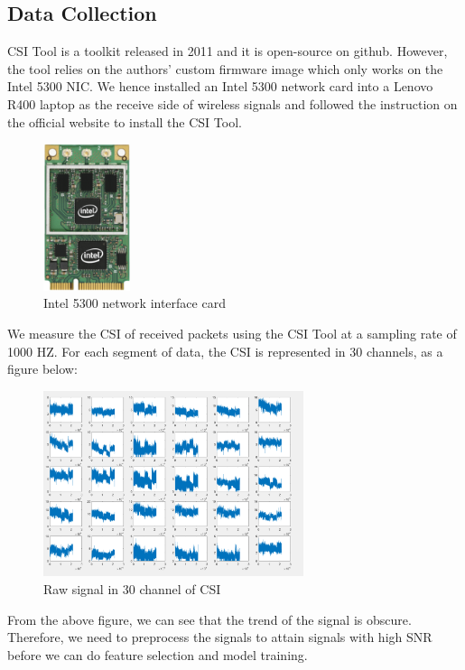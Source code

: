 \documentclass[conference]{IEEEtran}
\begin{document}
\subsection{Data Collection}

CSI Tool \cite{halperin2011tool} is a toolkit released in 2011 and it is open-source on github. However, the tool relies on the authors' custom firmware image which only works on the Intel 5300 NIC.
We hence installed an Intel 5300 network card into a Lenovo R400 laptop as the receive side of wireless signals and followed the instruction on the official website to install the CSI Tool.
\begin{figure}[H]
\begin{center}
\includegraphics[width=1in]{NIC.png}
\caption{Intel 5300 network interface card}
\end{center}
\end{figure}
We measure the CSI of received packets using the CSI Tool at a sampling rate of 1000 HZ. For each segment of data, the CSI is represented in 30 channels, as a figure below:
\begin{figure}[H]
\begin{center}
\includegraphics[width=3in]{Original.png}
\caption{Raw signal in 30 channel of CSI}
\end{center}
\end{figure}
From the above figure, we can see that the trend of the signal is obscure. Therefore, we need to preprocess the signals to attain signals with high SNR before we can do feature selection and model training.
\end{document}
